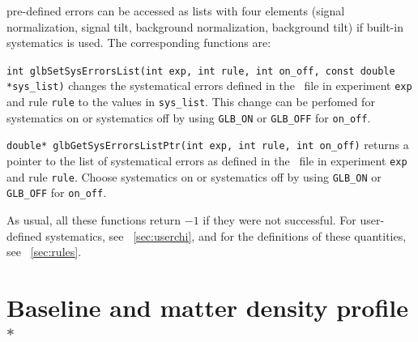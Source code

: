 pre-defined errors can be accessed as lists with four elements (signal
normalization, signal tilt, background normalization, background tilt) if built-in
systematics is used. The corresponding 
functions are:
\begin{function}
{\tt int glbSetSysErrorsList(int exp, int rule, int on\_off, const double *sys\_list)}
changes the systematical errors defined in the \AEDL\ file in experiment {\tt exp} and 
rule {\tt rule} to the values in {\tt sys\_list}. This change can be perfomed for
systematics on or systematics off by using {\tt GLB\_ON} or {\tt GLB\_OFF} for {\tt on\_off}. 
\end{function}
\begin{function}
{\tt double* glbGetSysErrorsListPtr(int exp, int rule, int on\_off)}
returns a pointer to the list of systematical errors as defined in the \AEDL\ file in experiment {\tt exp} and 
rule {\tt rule}. Choose
systematics on or systematics off by using {\tt GLB\_ON} or {\tt GLB\_OFF} for {\tt on\_off}. 
\end{function}
As usual, all these functions return $-1$ if they were not successful.
For user-defined systematics, see \Sec~\ref{sec:userchi}, and 
for the definitions of these quantities, see \Sec~\ref{sec:rules}. 

\section{Baseline and matter density profile$^*$}
\label{sec:baselinemd}

